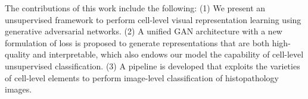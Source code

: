 \documentclass[journal]{IEEEtran}
\begin{document}

The contributions of this work include the following: (1) We present an unsupervised framework to perform cell-level visual representation learning using generative adversarial networks. (2) A unified GAN architecture with a new formulation of loss is proposed to generate representations that are both high-quality and interpretable, which also endows our model the capability of cell-level unsupervised classification. (3) A pipeline is developed that exploits the varieties of cell-level elements to perform image-level classification of histopathology images.


\end{document}
